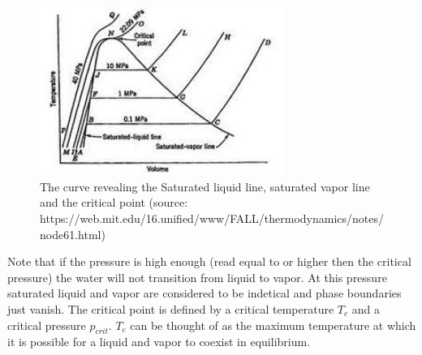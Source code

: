 \documentclass[11pt, a4paper]{article}
\begin{document}
\begin{figure}[h]
  \centerline{\includegraphics[width=80mm]{images/T,v diagram.jpg}}
  \caption{The curve revealing the Saturated liquid line, saturated vapor line and the critical point (source: https://web.mit.edu/16.unified/www/FALL/thermodynamics/notes/node61.html)}
\end{figure}
Note that if the pressure is high enough (read equal to or higher then the critical pressure) the water will not transition from liquid to vapor. At this pressure saturated liquid and vapor are considered to be indetical and phase boundaries just vanish. The critical point is defined by a critical temperature $T_c$ and a critical pressure $p_{crit}$. $T_c$ can be thought of as the maximum temperature at which it is possible for a liquid and vapor to coexist in equilibrium.
\end{document}
